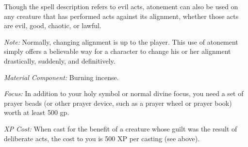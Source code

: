 Though the spell description refers to evil acts, atonement can also be 
used on any creature that has performed acts against its alignment, whether those 
acts are evil, good, chaotic, or lawful.

\textit{Note:} Normally, changing alignment is up to the player. This use of atonement simply offers a believable way for a character to change his or her alignment drastically, suddenly, and definitively.

\textit{Material Component:} Burning incense.

\textit{Focus:} In addition to your holy symbol or normal divine focus, you need 
a set of prayer beads (or other prayer device, such as a prayer wheel or prayer 
book) worth at least 500 gp.

\textit{XP Cost:} When cast for the benefit of a creature whose guilt was the result 
of deliberate acts, the cost to you is 500 XP per casting (see above).

